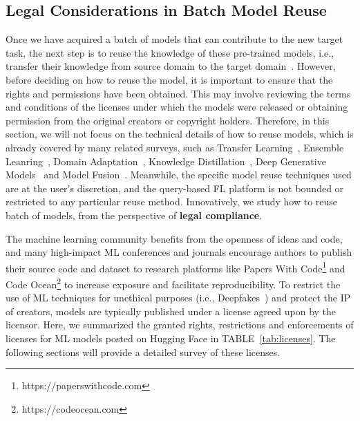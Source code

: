 \subsection{Legal Considerations in Batch Model Reuse}
\label{sec:how2reuse}
Once we have acquired a batch of models that can contribute to the new target task, the next step is to reuse the knowledge of these pre-trained models, i.e., transfer their knowledge from source domain to the target domain~\cite{pan2009survey}.
However, before deciding on how to reuse the model, it is important to ensure that the rights and permissions have been obtained. 
This may involve reviewing the terms and conditions of the licenses under which the models were released or obtaining permission from the original creators or copyright holders.
Therefore, in this section, we will not focus on the technical details of how to reuse models, which is already covered by many related surveys, such as Transfer Learning~\cite{pan2009survey}, Ensemble Leanring~\cite{zhou2012ensemble}, Domain Adaptation~\cite{wang2018deep}, Knowledge Distillation~\cite{wang2021knowledge}, Deep Generative Models~\cite{cao2022survey} and Model Fusion~\cite{ji2021emerging}.
Meanwhile, the specific model reuse techniques used are at the user's discretion, and the query-based FL platform is not bounded or restricted to any particular reuse method.
Innovatively, we study how to reuse batch of models, from the perspective of \textbf{legal compliance}.

The machine learning community benefits from the openness of ideas and code, and many high-impact ML conferences and journals encourage authors to publish their source code and dataset to research platforms like Papers With Code\footnote{https://paperswithcode.com} and Code Ocean\footnote{https://codeocean.com} to increase exposure and facilitate reproducibility.
To restrict the use of ML techniques for unethical purposes (i.e., Deepfakes~\cite{mirsky2021creation}) and protect the IP of creators, models are typically published under a license agreed upon by the licensor.
Here, we summarized the granted rights, restrictions and enforcements of licenses for ML models posted on Hugging Face in TABLE~\ref{tab:licenses}.
The following sections will provide a detailed survey of these licenses.


